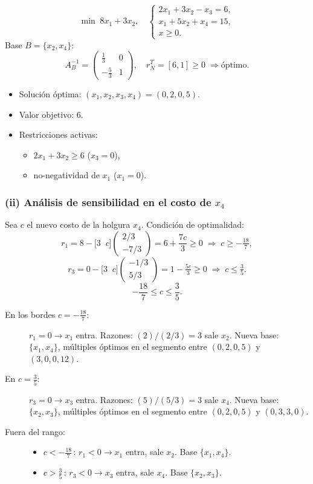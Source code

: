 \documentclass{article}
\begin{document}
\[
\min\;8x_1+3x_2,\quad
\begin{cases}
2x_1 + 3x_2 - x_3 = 6,\\
x_1 + 5x_2 + x_4 = 15,\\
x\ge0.
\end{cases}
\]
Base $B=\{x_2,x_4\}$:
\[
A_B^{-1}=\begin{pmatrix}\tfrac13&0\\-\tfrac53&1\end{pmatrix},\quad
r^T_N=[6,1]\ge0\;\Rightarrow\text{óptimo}.
\]
\begin{itemize}
  \item Solución óptima: $(x_1,x_2,x_3,x_4)=(0,2,0,5)$.
  \item Valor objetivo: $6$.
  \item Restricciones activas: 
    \begin{itemize}
      \item $2x_1+3x_2\ge6$ ($x_3=0$),
      \item no-negatividad de $x_1$ ($x_1=0$).
    \end{itemize}
\end{itemize}

\subsubsection*{(ii) Análisis de sensibilidad en el costo de $x_4$}

Sea $c$ el nuevo costo de la holgura $x_4$. Condición de optimalidad:  
\[
r_1 = 8 - \bigl[3\;\;c\bigr]\begin{pmatrix}2/3\\-7/3\end{pmatrix}
=6+\frac{7c}{3}\ge0
\;\Longrightarrow\;
c\ge-\tfrac{18}{7},
\]
\[
r_3 = 0 - \bigl[3\;\;c\bigr]\begin{pmatrix}-1/3\\5/3\end{pmatrix}
=1-\tfrac{5c}{3}\ge0
\;\Longrightarrow\;
c\le\tfrac{3}{5}.
\]
\[
\boxed{-\frac{18}{7}\le c\le \frac{3}{5}.}
\]

\begin{description}
  \item[En los bordes $c=-\tfrac{18}{7}$:] $r_1=0\to x_1$ entra. Razones: $(2)/(2/3)=3$ sale $x_2$.  
    Nueva base: $\{x_1,x_4\}$, múltiples óptimos en el segmento entre $(0,2,0,5)$ y $(3,0,0,12)$.
  \item[En $c=\tfrac{3}{5}$:] $r_3=0\to x_3$ entra. Razones: $(5)/(5/3)=3$ sale $x_4$.  
    Nueva base: $\{x_2,x_3\}$, múltiples óptimos en el segmento entre $(0,2,0,5)$ y $(0,3,3,0)$.
  \item[Fuera del rango:]
    \begin{itemize}
      \item $c<-\tfrac{18}{7}\,$: $r_1<0\to x_1$ entra, sale $x_2$. Base $\{x_1,x_4\}$.
      \item $c>\tfrac{3}{5}\,$: $r_3<0\to x_3$ entra, sale $x_4$. Base $\{x_2,x_3\}$.
    \end{itemize}
\end{description}
\end{document}
